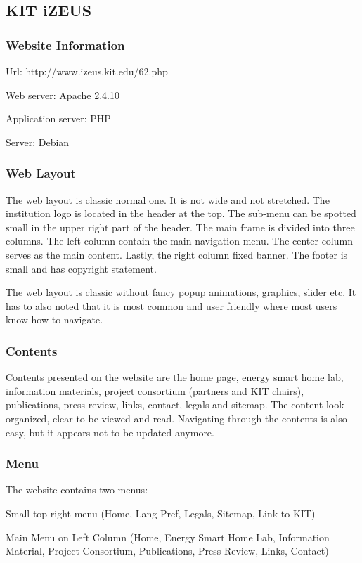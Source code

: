\subsection{KIT iZEUS}
\subsubsection*{Website Information}
\begin{itemize*}
\item Url: http://www.izeus.kit.edu/62.php
\item Web server: Apache 2.4.10
\item Application server: PHP
\item Server: Debian
\end{itemize*}

\subsubsection*{Web Layout}
The web layout is classic normal one. It is not wide and not stretched. The institution logo is located in the header at the top. The sub-menu can be spotted small in the upper right part of the header. The main frame is divided into three columns. The left column contain the main navigation menu. The center column serves as the main content. Lastly, the right column fixed banner. The footer is small and has copyright statement.

The web layout is classic without fancy popup animations, graphics, slider etc. It has to also noted that it is most common and user friendly where most users know how to navigate.

\subsubsection*{Contents}
Contents presented on the website are the home page, energy smart home lab, information materials, project consortium (partners and KIT chairs), publications, press review, links, contact, legals and sitemap. The content look organized, clear to be viewed and read. Navigating through the contents is also easy, but it appears not to be updated anymore.

\subsubsection*{Menu}
The website contains two menus:
\begin{itemize*}
\item Small top right menu (Home, Lang Pref, Legals, Sitemap, Link to KIT)
\item Main Menu on Left Column (Home, Energy Smart Home Lab, Information Material, Project Consortium, Publications, Press Review, Links, Contact)
\end{itemize*}

